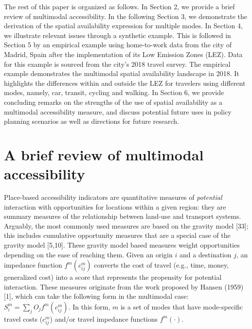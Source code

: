 \documentclass[10pt,letterpaper]{article}
\begin{document}
The rest of this paper is organized as follows. In Section 2, we provide
a brief review of multimodal accessibility. In the following Section 3,
we demonstrate the derivation of the spatial availability expression for
multiple modes. In Section 4, we illustrate relevant issues through a
synthetic example. This is followed in Section 5 by an empirical example
using home-to-work data from the city of Madrid, Spain after the
implementation of its Low Emission Zones (LEZ). Data for this example is
sourced from the city's 2018 travel survey. The empirical example
demonstrates the multimodal spatial availability landscape in 2018. It
highlights the differences within and outside the LEZ for travelers
using different modes, namely, car, transit, cycling and walking. In
Section 6, we provide concluding remarks on the strengths of the use of
spatial availability as a multimodal accessibility measure, and discuss
potential future uses in policy planning scenarios as well as directions
for future research.

\hypertarget{a-brief-review-of-multimodal-accessibility}{%
\section{A brief review of multimodal
accessibility}\label{a-brief-review-of-multimodal-accessibility}}

Place-based accessibility indicators are quantitative measures of
\emph{potential} interaction with opportunities for locations within a
given region: they are summary measures of the relationship between
land-use and transport systems. Arguably, the most commonly used
measures are based on the gravity model {[}33{]}; this includes
cumulative opportunity measures that are a special case of the gravity
model {[}5,10{]}. These gravity model based measures weight
opportunities depending on the ease of reaching them. Given an origin
\(i\) and a destination \(j\), an impedance function \(f^{m}(c^m_{ij})\)
converts the cost of travel (e.g., time, money, generalized cost) into a
score that represents the propensity for potential interaction. These
measures originate from the work proposed by Hansen (1959) {[}1{]},
which can take the following form in the multimodal case:
\(S_i^m = \sum_j O_j f^m(c_{ij}^m)\). In this form, \(m\) is a set of
modes that have mode-specific travel costs (\(c_{ij}^m\)) and/or travel
impedance functions \(f^m(\cdot)\).
\end{document}
